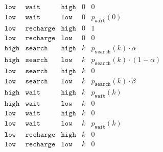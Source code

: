 \begin{solution}
\begin{align*}
\begin{array}{l|l|l|r|l}
        \texttt{low}  & \texttt{wait}     & \texttt{high} &  0 & 0                                       \\
        \texttt{low}  & \texttt{wait}     & \texttt{low}  &  0 & p_\texttt{wait}(0)                      \\
        \texttt{low}  & \texttt{recharge} & \texttt{high} &  0 & 1                                       \\
        \texttt{low}  & \texttt{recharge} & \texttt{low}  &  0 & 0                                       \\
        \texttt{high} & \texttt{search}   & \texttt{high} &  k & p_\texttt{search}(k) \cdot \alpha       \\
        \texttt{high} & \texttt{search}   & \texttt{low}  &  k & p_\texttt{search}(k) \cdot (1 - \alpha) \\
        \texttt{low}  & \texttt{search}   & \texttt{high} &  k & 0                                       \\
        \texttt{low}  & \texttt{search}   & \texttt{low}  &  k & p_\texttt{search}(k) \cdot \beta        \\
        \texttt{high} & \texttt{wait}     & \texttt{high} &  k & p_\texttt{wait}(k)                      \\
        \texttt{high} & \texttt{wait}     & \texttt{low}  &  k & 0                                       \\
        \texttt{low}  & \texttt{wait}     & \texttt{high} &  k & 0                                       \\
        \texttt{low}  & \texttt{wait}     & \texttt{low}  &  k & p_\texttt{wait}(k)                      \\
        \texttt{low}  & \texttt{recharge} & \texttt{high} &  k & 0                                       \\
        \texttt{low}  & \texttt{recharge} & \texttt{low}  &  k & 0                                       \\
    \end{array}
\end{align*}

\end{solution}

